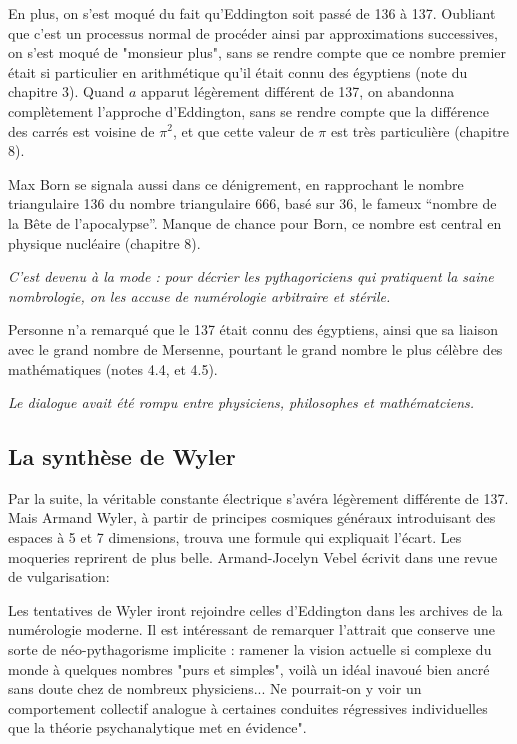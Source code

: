 \documentclass[a4paper,12pt]{article}
\begin{document}
En plus, on s'est moqué du fait qu'Eddington soit passé de 136 à 137. Oubliant que c'est un processus normal de procéder ainsi par approximations successives, on s'est moqué de "monsieur plus", sans se rendre compte que ce nombre premier était si particulier en arithmétique qu'il était connu des égyptiens (note du chapitre 3). Quand $a$ apparut légèrement différent de 137, on abandonna complètement l'approche d'Eddington, sans se rendre compte que la différence des carrés est voisine de $\pi^2$, et que cette valeur de $\pi$ est très particulière (chapitre 8).
 
Max Born se signala aussi dans ce dénigrement, en rapprochant le nombre triangulaire 136 du nombre triangulaire 666, basé sur 36, le fameux ``nombre de la Bête de l'apocalypse''. Manque de chance pour Born, ce nombre est central en physique nucléaire (chapitre 8). 

\textit{C'est devenu à la mode : pour décrier les pythagoriciens qui pratiquent la saine nombrologie, on les accuse de numérologie arbitraire et stérile.}

Personne n'a remarqué que le 137 était connu des égyptiens, ainsi que sa liaison avec le grand nombre de Mersenne, pourtant le grand nombre le plus célèbre des mathématiques (notes 4.4, et 4.5). 


\textit{Le dialogue avait été rompu entre physiciens, philosophes et mathématciens.}


\subsection{La synthèse de Wyler}

Par la suite, la véritable constante électrique s'avéra légèrement différente de 137. Mais Armand Wyler, à partir de principes cosmiques généraux introduisant des espaces à 5 et 7 dimensions, trouva une formule qui expliquait l'écart. Les moqueries reprirent de plus belle. Armand-Jocelyn Vebel écrivit dans une revue de vulgarisation: 

Les tentatives de Wyler iront rejoindre  celles d'Eddington dans les archives de la numérologie moderne. Il est intéressant de remarquer l'attrait que conserve une sorte de néo-pythagorisme implicite : ramener la vision actuelle si complexe du monde à quelques nombres "purs et simples", voilà un idéal inavoué bien ancré sans doute chez de nombreux physiciens... Ne pourrait-on y voir un comportement collectif analogue à certaines conduites régressives individuelles que la théorie psychanalytique met en évidence".
\end{document}
